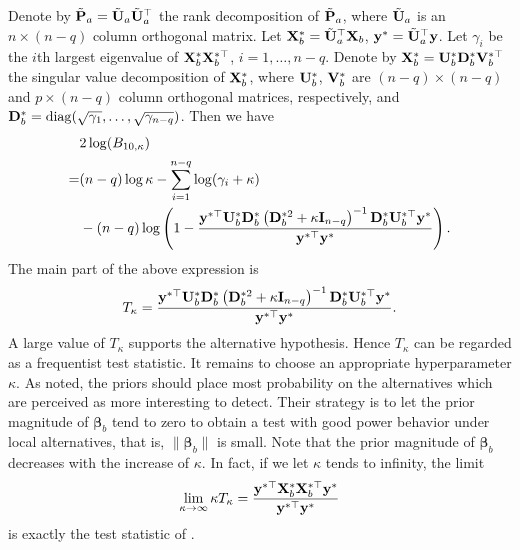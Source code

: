 \documentclass[smallextended]{svjour3}       %
\DeclareMathOperator{\mydiag}{diag}
\newcommand{\By}{\mathbf{y}}    \newcommand{\Bz}{\mathbf{z}}
\newcommand{\bfsym}[1]{\ensuremath{\boldsymbol{#1}}}
\def\bbeta{\bfsym \beta}
\begin{document}
Denote by $\tilde {\mathbf{P}}_a=\tilde{\mathbf{U}}_a \tilde{\mathbf{U}}_a^\top$ the rank decomposition of $\tilde {\mathbf{P}}_a$, where $\tilde{\mathbf{U}}_a$ is an $n\times (n-q)$ column orthogonal matrix.
Let $\mathbf{X}_b^* = \tilde{\mathbf{U}}_a^\top \mathbf{X}_b$, $\By^* =\tilde \BU_a^\top \By$.
Let $\gamma_i$ be the $i$th largest eigenvalue of $\mathbf{X}^*_b \mathbf{X}_b^{*\top}$, $i=1,\ldots, n-q$.
Denote by $\mathbf{X}_b^* =\mathbf{U}_{b}^* \mathbf{D}_{b}^* \mathbf{V}_b^{*\top}$ the singular value decomposition of $\mathbf{X}_{b}^*$, where  $\mathbf{U}_{b}^*$, $\mathbf{V}_b^*$ are $(n-q)\times (n-q)$ and $p\times (n-q)$ column orthogonal matrices, respectively, and $\BD_{b}^*=\mydiag (\sqrt {\gamma_1},\ldots, \sqrt{\gamma_{n-q}})$.
Then we have
\begin{equation*}
    \begin{split}
        &2\log (B_{10,\kappa})
        \\
        =&
        (n-q)\log \kappa - \sum_{i=1}^{n-q}\log ( \gamma_i + \kappa )
        \\
         &-(n-q)\log\left(1-\frac{\By^{*\top} \BU_b^*  \BD_b^{*} \left(  \BD_b^{*2} + \kappa \BI_{n-q} \right)^{-1} \BD_b^{*}   \BU_b^{*\top} \By^* }{\By^{*\top} \By^*}\right)
         .
    \end{split}
\end{equation*}
The main part of the above expression is
\begin{equation*}
    T_{\kappa} = \frac{\By^{*\top} \BU_b^*  \BD_b^{*} \left(  \BD_b^{*2} + \kappa \BI_{n-q} \right)^{-1} \BD_b^{*}   \BU_b^{*\top} \By^* }{\By^{*\top} \By^*}.
\end{equation*}
A large value of $T_{\kappa}$ supports the alternative hypothesis.
Hence $T_{\kappa}$ can be regarded as a frequentist test statistic.
It remains to choose an appropriate hyperparameter $\kappa$.
As \cite{Goeman2006} noted, the priors should place most probability on the alternatives which are perceived as more interesting to detect.
Their strategy is to let the prior magnitude of $\bbeta_b$ tend to zero to obtain a test with good power behavior under local alternatives, that is, $\|\bbeta_b\|$ is small.
Note that the prior magnitude of $\bbeta_b$ decreases with the increase of $\kappa$.
In fact, if we let $\kappa$ tends to infinity, the limit
\begin{equation*}
    \lim_{\kappa\to \infty} \kappa T_{\kappa} = \frac{\By^{*\top} \BX_b^* \BX_b^{*\top} \By^* }{\By^{*\top} \By^*}
\end{equation*}
is exactly the test statistic of \cite{Goeman2006}.
\end{document}
